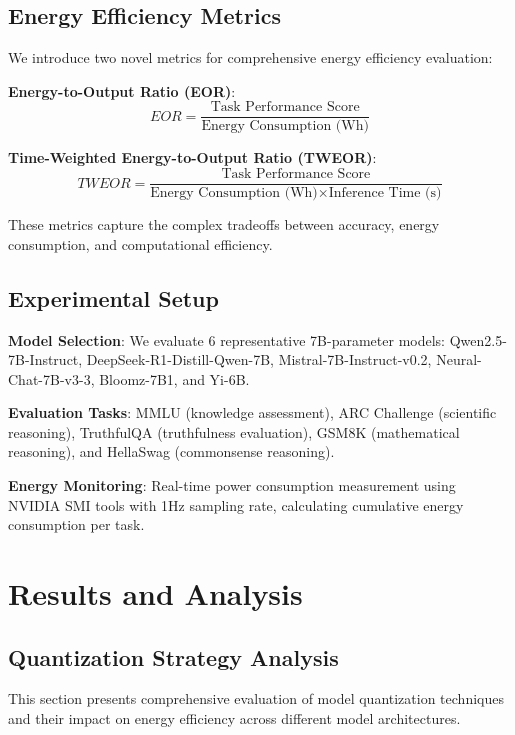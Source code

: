 \documentclass[sigconf]{acmart}
\begin{document}
\subsection{Energy Efficiency Metrics}

We introduce two novel metrics for comprehensive energy efficiency evaluation:

\textbf{Energy-to-Output Ratio (EOR)}:
\begin{equation}
EOR = \frac{\text{Task Performance Score}}{\text{Energy Consumption (Wh)}}
\end{equation}

\textbf{Time-Weighted Energy-to-Output Ratio (TWEOR)}:
\begin{equation}
TWEOR = \frac{\text{Task Performance Score}}{\text{Energy Consumption (Wh)} \times \text{Inference Time (s)}}
\end{equation}

These metrics capture the complex tradeoffs between accuracy, energy consumption, and computational efficiency.

\subsection{Experimental Setup}

\textbf{Model Selection}: We evaluate 6 representative 7B-parameter models: Qwen2.5-7B-Instruct, DeepSeek-R1-Distill-Qwen-7B, Mistral-7B-Instruct-v0.2, Neural-Chat-7B-v3-3, Bloomz-7B1, and Yi-6B.

\textbf{Evaluation Tasks}: MMLU (knowledge assessment), ARC Challenge (scientific reasoning), TruthfulQA (truthfulness evaluation), GSM8K (mathematical reasoning), and HellaSwag (commonsense reasoning).

\textbf{Energy Monitoring}: Real-time power consumption measurement using NVIDIA SMI tools with 1Hz sampling rate, calculating cumulative energy consumption per task.

\section{Results and Analysis}

\subsection{Quantization Strategy Analysis}

This section presents comprehensive evaluation of model quantization techniques and their impact on energy efficiency across different model architectures.
\end{document}
